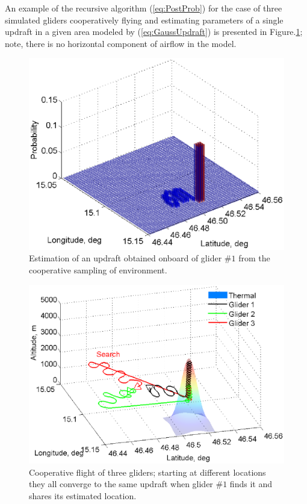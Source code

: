 \documentclass{ifacconf}
\begin{document}
An example of the recursive algorithm (\ref{eq:PostProb}) for the case of
three simulated gliders cooperatively flying and estimating parameters of a
single updraft in a given area modeled by (\ref{eq:GaussUpdraft}) is presented in Figure.\ref{fig:SimPDF}; note, there is no horizontal component of airflow in the model.
\begin{figure}[thpb]
  \centering
  \includegraphics[scale=0.51]{Figures/Mapping_thermals.eps}
  \caption{Estimation of an updraft obtained onboard of glider $\#1$ from
  the cooperative sampling of environment.}
  \label{fig:SimPDF}
\end{figure}
\begin{figure}[thpb]
  \centering
  \includegraphics[scale=0.41]{Figures/paths_cooperative_flight.eps}
  \caption{Cooperative flight of three gliders; starting at different locations
  they all converge to the same updraft when glider $\#1$ finds it and
  shares its estimated location.}
  \label{fig:CoopFlightPaths}
\end{figure}
\end{document}
